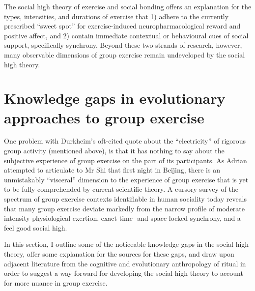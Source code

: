 \begin{CJK}{UTF8}{gbsn}
The social high theory of exercise and social bonding offers an explanation for the types, intensities, and durations of exercise that 1) adhere to the currently prescribed ``sweet spot'' for exercise-induced neuropharmacological reward and positive affect, and 2) contain immediate contextual or behavioural cues of social support, specifically synchrony.  Beyond these two strands of research, however, many observable dimensions of group exercise remain undeveloped by the social high theory.

\section{Knowledge gaps in evolutionary approaches to group exercise}

One problem with Durkheim's oft-cited quote about the ``electricity'' of rigorous group activity (mentioned above), is that it has nothing to say about the subjective experience of group exercise on the part of its participants.  As Adrian attempted to articulate to Mr Shi that first night in Beijing, there is an unmistakably ``visceral'' dimension to the experience of group exercise that is yet to be fully comprehended by current scientific theory. A cursory survey of the spectrum of group exercise contexts identifiable in human sociality today reveals that many group exercise deviate markedly from the narrow profile of moderate intensity physiological exertion, exact time- and space-locked synchrony, and a feel good social high.

In this section, I outline some of the noticeable knowledge gaps in the social high theory, offer some explanation for the sources for these gaps, and draw upon adjacent literature from the cognitive and evolutionary anthropology of ritual in order to suggest a way forward for developing the social high theory to account for more nuance in group exercise.



\end{CJK}

